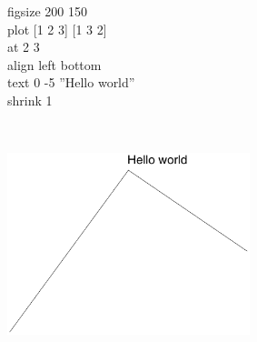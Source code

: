 \documentclass[11pt]{article}
\begin{document}
\begin{centering}\noindent%
\begin{minipage}[b]{.3\textwidth}
figsize 200 150\\
plot [1 2 3] [1 3 2]\\
at 2 3\\
align left bottom\\
text 0 -5 ''Hello world''\\
shrink 1
\end{minipage}
~
~
\begin{minipage}[b]{.45\textwidth}
\includegraphics[width=200pt]{directuse-eg}
\end{minipage}

\end{centering}
\medskip

  
\end{document}
